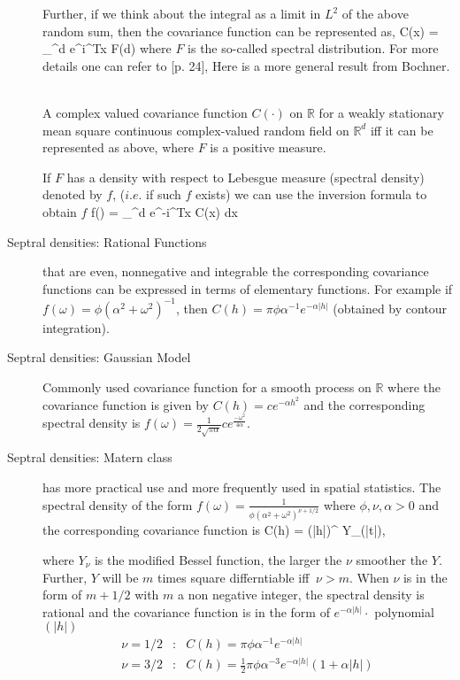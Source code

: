 \begin{description}
Further, if we think about the integral as a limit in $L^2$ of the above random sum, then the covariance function can be represented as,
\beq C(x) = \int_{^d} e^{i\omega^Tx} F(d\omega)\eeq
where $F$ is the so-called spectral distribution. For more details one can refer to \cite{stein1999}[p. 24],  Here is a more general result from Bochner.

\begin{thm}\hfill \\
A complex valued covariance function $C(\cdot)$ on $\mathbb{R}$ for a weakly stationary mean square continuous complex-valued random field on $\mathbb{R}^d$ iff it can be represented as above, where $F$ is a positive measure.
\end{thm}

If $F$ has a density with respect to Lebesgue measure (spectral density) denoted by $f$, ($i.e.$ if such $f$ exists) we can use the inversion formula to obtain $f$
\beq f(\omega) =   \int_{^d} e^{-i\omega^Tx} C(x) dx \eeq

\item [Septral densities:  Rational Functions] that are even,  nonnegative and integrable the corresponding covariance functions can be expressed in terms of elementary functions. For example if $f(\omega) =\phi (\alpha^2+\omega^2)^{-1}$, then $C(h) = \pi\phi\alpha^{-1}e^{-\alpha|h|}$ (obtained by contour integration).

\item [Septral densities: Gaussian Model]
Commonly used covariance function for a smooth process on $\mathbb{R}$ where the covariance function is given by $C(h)=ce^{-\alpha h^2}$ and the corresponding spectral density is $ f(\omega) = \frac{1}{2\sqrt{\pi\alpha}}c e^{\frac{-\omega^2}{4\alpha}}$.

\item [Septral densities: Matern class] has more practical use and more frequently used in spatial statistics. The spectral density of the form $f(\omega) =\frac{1}{\phi(\alpha^2+\omega^2)^{\nu+1/2}}$ where $\phi,\nu,\alpha>0$ and the corresponding covariance function  is
\beq \label{matern_var} C(h) =  (\alpha|h|)^{\nu} Y_{\nu}(\alpha|t|),\eeq

where $Y_{\nu}$ is the modified Bessel function, the larger the $\nu$ smoother the $Y$. Further, $Y$ will be $m$ times square differntiable iff $\ \nu>m$. When $\nu$ is in the form of $m+1/2$ with $m$ a non negative integer, the spectral density is rational and the covariance function is in the form of $e^{-\alpha|h|}\cdot$ polynomial$(|h|)$ \\
\begin{eqnarray*}
\nu = 1/2 &:& C(h) = \pi\phi\alpha^{-1}e^{-\alpha|h|}\\
\nu = 3/2 &:& C(h) = \frac{1}{2}\pi\phi\alpha^{-3}e^{-\alpha|h|}(1+\alpha|h|)\\
\end{eqnarray*}


\end{description}
